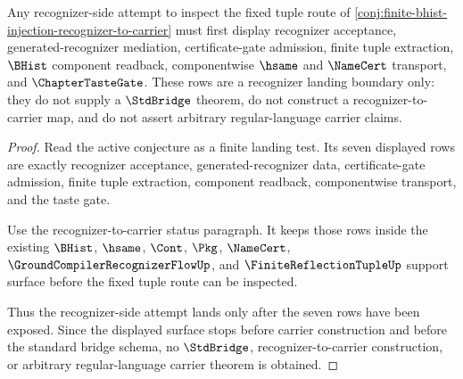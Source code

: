 \begin{theorem}
\label{thm:finite-bhist-injection-recognizer-landing-sharpener}
Any recognizer-side attempt to inspect the fixed tuple route of \autoref{conj:finite-bhist-injection-recognizer-to-carrier} must first display recognizer acceptance, generated-recognizer mediation, certificate-gate admission, finite tuple extraction, $\BHist$ component readback, componentwise $\hsame$ and $\NameCert$ transport, and $\ChapterTasteGate$. These rows are a recognizer landing boundary only: they do not supply a $\StdBridge$ theorem, do not construct a recognizer-to-carrier map, and do not assert arbitrary regular-language carrier claims.
\end{theorem}
\begin{proof}
Read the active conjecture as a finite landing test. Its seven displayed rows are exactly recognizer acceptance, generated-recognizer data, certificate-gate admission, finite tuple extraction, component readback, componentwise transport, and the taste gate.

Use the recognizer-to-carrier status paragraph. It keeps those rows inside the existing $\BHist$, $\hsame$, $\Cont$, $\Pkg$, $\NameCert$, $\GroundCompilerRecognizerFlowUp$, and $\FiniteReflectionTupleUp$ support surface before the fixed tuple route can be inspected.

Thus the recognizer-side attempt lands only after the seven rows have been exposed. Since the displayed surface stops before carrier construction and before the standard bridge schema, no $\StdBridge$, recognizer-to-carrier construction, or arbitrary regular-language carrier theorem is obtained.
\end{proof}

